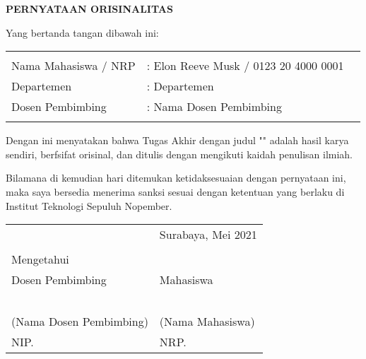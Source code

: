 \begin{center}
  \large
  \textbf{PERNYATAAN ORISINALITAS}
\end{center}

\thispagestyle{empty}

\vspace{2ex}


\noindent Yang bertanda tangan dibawah ini:

\noindent\begin{tabularx}{\textwidth}{X X l}
  & \\
  Nama Mahasiswa / NRP &: Elon Reeve Musk / 0123 20 4000 0001 \\
  Departemen &: Departemen \\
  Dosen Pembimbing &: Nama Dosen Pembimbing \\
  & \\
\end{tabularx}

Dengan ini menyatakan bahwa Tugas Akhir dengan judul "" adalah hasil karya sendiri, berfsifat orisinal, dan ditulis dengan mengikuti kaidah penulisan ilmiah.

Bilamana di kemudian hari ditemukan ketidaksesuaian dengan pernyataan ini, maka saya bersedia menerima sanksi sesuai dengan ketentuan yang berlaku di Institut Teknologi Sepuluh Nopember.

\vspace{8ex}

\noindent\begin{tabularx}{\textwidth}{X l}
  & Surabaya, Mei 2021\\
  & \\
  Mengetahui & \\
  Dosen Pembimbing & Mahasiswa\\
  & \\
  & \\
  & \\
  & \\
  & \\
  (Nama Dosen Pembimbing) & (Nama Mahasiswa) \\
  NIP. & NRP. \\
\end{tabularx}
